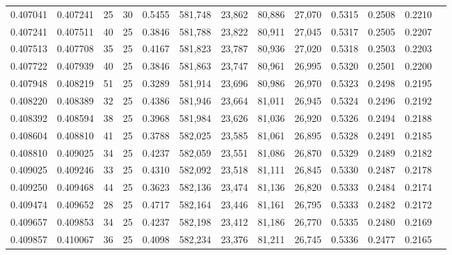 \begin{tabular}{rrrrrrrrrrrrr}
0.407041 & 0.407241 &    25 &  30 &                                     0.5455 & 581,748 &  23,862 &  80,886 &  27,070 & 0.5315 & 0.2508 & 0.2210 \\
0.407241 & 0.407511 &    40 &  25 &                                     0.3846 & 581,788 &  23,822 &  80,911 &  27,045 & 0.5317 & 0.2505 & 0.2207 \\
0.407513 & 0.407708 &    35 &  25 &                                     0.4167 & 581,823 &  23,787 &  80,936 &  27,020 & 0.5318 & 0.2503 & 0.2203 \\
0.407722 & 0.407939 &    40 &  25 &                                     0.3846 & 581,863 &  23,747 &  80,961 &  26,995 & 0.5320 & 0.2501 & 0.2200 \\
0.407948 & 0.408219 &    51 &  25 &                                     0.3289 & 581,914 &  23,696 &  80,986 &  26,970 & 0.5323 & 0.2498 & 0.2195 \\
0.408220 & 0.408389 &    32 &  25 &                                     0.4386 & 581,946 &  23,664 &  81,011 &  26,945 & 0.5324 & 0.2496 & 0.2192 \\
0.408392 & 0.408594 &    38 &  25 &                                     0.3968 & 581,984 &  23,626 &  81,036 &  26,920 & 0.5326 & 0.2494 & 0.2188 \\
0.408604 & 0.408810 &    41 &  25 &                                     0.3788 & 582,025 &  23,585 &  81,061 &  26,895 & 0.5328 & 0.2491 & 0.2185 \\
0.408810 & 0.409025 &    34 &  25 &                                     0.4237 & 582,059 &  23,551 &  81,086 &  26,870 & 0.5329 & 0.2489 & 0.2182 \\
0.409025 & 0.409246 &    33 &  25 &                                     0.4310 & 582,092 &  23,518 &  81,111 &  26,845 & 0.5330 & 0.2487 & 0.2178 \\
0.409250 & 0.409468 &    44 &  25 &                                     0.3623 & 582,136 &  23,474 &  81,136 &  26,820 & 0.5333 & 0.2484 & 0.2174 \\
0.409474 & 0.409652 &    28 &  25 &                                     0.4717 & 582,164 &  23,446 &  81,161 &  26,795 & 0.5333 & 0.2482 & 0.2172 \\
0.409657 & 0.409853 &    34 &  25 &                                     0.4237 & 582,198 &  23,412 &  81,186 &  26,770 & 0.5335 & 0.2480 & 0.2169 \\
0.409857 & 0.410067 &    36 &  25 &                                     0.4098 & 582,234 &  23,376 &  81,211 &  26,745 & 0.5336 & 0.2477 & 0.2165 \\

\end{tabular}
